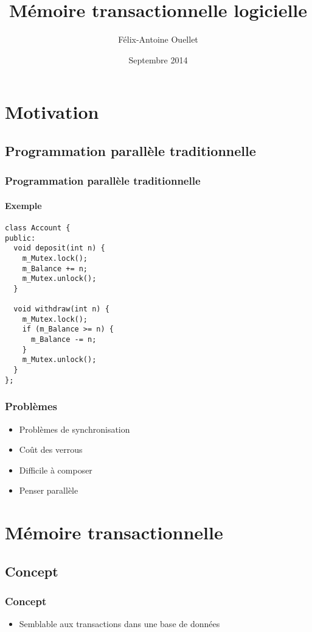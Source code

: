 \documentclass{beamer}
\author[Félix-Antoine Ouellet]{Félix-Antoine Ouellet}
\title[MTL\hspace{2em}\insertframenumber/\inserttotalframenumber]{Mémoire transactionnelle logicielle}
\institute{Université de Sherbrooke}
\date{Septembre 2014}
\begin{document}
\begin{frame}
\titlepage %
\end{frame}

\section{Motivation}
\subsection{Programmation parallèle traditionnelle}

\newlength\someheight
\setlength\someheight{3.5cm}

\begin{frame}[fragile]
\frametitle{Programmation parallèle traditionnelle}
\framesubtitle{Exemple}
\begin{adjustbox}{width=\textwidth,height=\someheight,keepaspectratio}
\begin{lstlisting}
class Account {
public:
  void deposit(int n) {
    m_Mutex.lock();
    m_Balance += n;
    m_Mutex.unlock();
  }

  void withdraw(int n) {
    m_Mutex.lock();
    if (m_Balance >= n) {
      m_Balance -= n;
    }
    m_Mutex.unlock();
  }
};
\end{lstlisting}
\end{adjustbox}
\end{frame}

\begin{frame}
\frametitle{Problèmes}
\begin{itemize}
\item Problèmes de synchronisation
\item<2-> Coût des verrous
\item<3-> Difficile à composer
\item<4-> Penser parallèle
\end{itemize}
\end{frame}

\section{Mémoire transactionnelle}
\subsection{Concept}
\begin{frame}
\frametitle{Concept}
\begin{itemize}
\item Semblable aux transactions dans une base de données
\end{itemize}
\end{frame}
\end{document}
